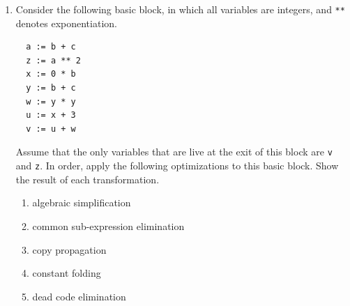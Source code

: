 \documentclass[11pt]{article}
\begin{document}
\begin{enumerate}
\item
Consider the following basic block, in which all variables are
integers, and \texttt{**} denotes exponentiation.
\begin{verbatim}
  a := b + c
  z := a ** 2
  x := 0 * b
  y := b + c
  w := y * y
  u := x + 3
  v := u + w
\end{verbatim}
Assume that the only variables that are live at the exit of this block
are \texttt{v} and \texttt{z}.  In order, apply the following
optimizations to this basic block.  Show the result of each
transformation.
\begin{enumerate}
\item algebraic simplification
\item common sub-expression elimination
\item copy propagation
\item constant folding
\item dead code elimination
\end{enumerate}


\end{enumerate}
\end{document}
